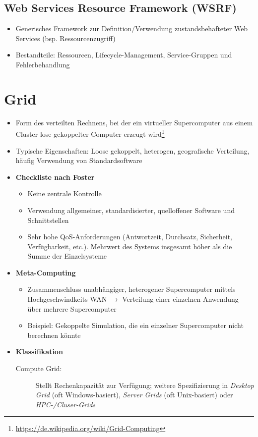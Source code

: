 \subsection{Web Services Resource Framework (WSRF)}
\begin{itemize}
	\item Generisches Framework zur Definition/Verwendung zustandsbehafteter Web Services (bsp. Ressourcenzugriff)
	\item Bestandteile: Ressourcen, Lifecycle-Management, Service-Gruppen und Fehlerbehandlung
\end{itemize}



\section{Grid}
\begin{itemize}
	\item Form des verteilten Rechnens, bei der ein virtueller Supercomputer aus einem Cluster lose gekoppelter Computer erzeugt wird\footnote{\url{https://de.wikipedia.org/wiki/Grid-Computing}}
	\item Typische Eigenschaften: Loose gekoppelt, heterogen, geografische Verteilung, häufig Verwendung von Standardsoftware
	\item \textbf{Checkliste nach Foster}
	\begin{itemize}
		\item Keine zentrale Kontrolle
		\item Verwendung allgemeiner, standardisierter, quelloffener Software und Schnittstellen
		\item Sehr hohe QoS-Anforderungen (Antwortzeit, Durchsatz, Sicherheit, Verfügbarkeit, etc.). Mehrwert des Systems insgesamt höher als die Summe der Einzelsysteme 
	\end{itemize}
	\item \textbf{Meta-Computing}
	\begin{itemize}
		\item Zusammenschluss unabhängiger, heterogener Supercomputer mittels Hochgeschwindkeits-WAN \(\rightarrow\) Verteilung einer einzelnen Anwendung über mehrere Supercomputer
		\item Beispiel: Gekoppelte Simulation, die ein einzelner Supercomputer nicht berechnen könnte
	\end{itemize}
	\item \textbf{Klassifikation}
	\begin{description}
		\item[Compute Grid:] Stellt Rechenkapazität zur Verfügung; weitere Spezifizierung in \textit{Desktop Grid} (oft Windows-basiert), \textit{Server Grids} (oft Unix-basiert) oder \textit{HPC-/Cluser-Grids}

\end{description}
\end{itemize}
